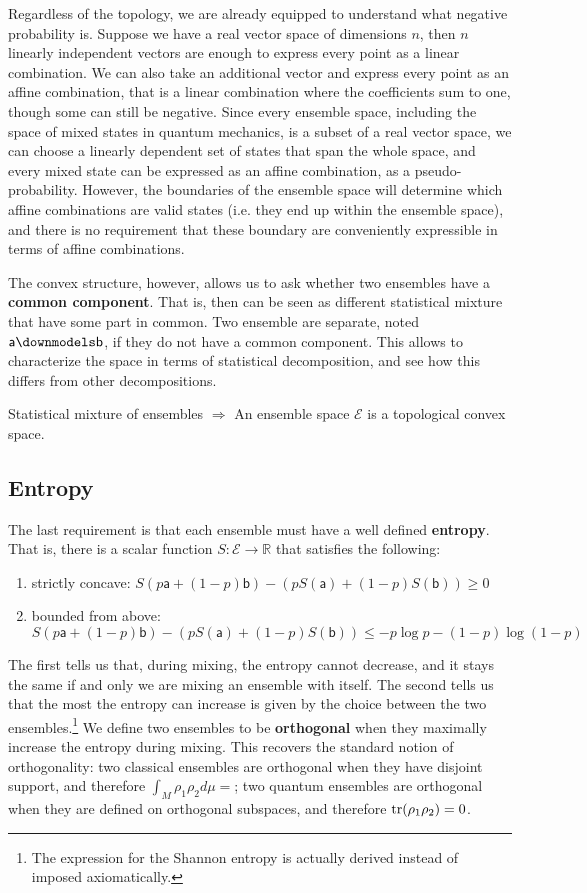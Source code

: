 \documentclass[10pt,twocolumn, nofootinbib]{revtex4-2}
\newcommand{\ens}[1][e] {\mathsf{#1}} %
\newcommand{\Ens}[1][E] {\mathcal{#1}} %
\def\separate{\downmodels}
\begin{document}
Regardless of the topology, we are already equipped to understand what negative probability is. Suppose we have a real vector space of dimensions $n$, then $n$ linearly independent vectors are enough to express every point as a linear combination. We can also take an additional vector and express every point as an affine combination, that is a linear combination where the coefficients sum to one, though some can still be negative. Since every ensemble space, including the space of mixed states in quantum mechanics, is a subset of a real vector space, we can choose a linearly dependent set of states that span the whole space, and every mixed state can be expressed as an affine combination, as a pseudo-probability. However, the boundaries of the ensemble space will determine which affine combinations are valid states (i.e. they end up within the ensemble space), and there is no requirement that these boundary are conveniently expressible in terms of affine combinations.

The convex structure, however, allows us to ask whether two ensembles have a \textbf{common component}. That is, then can be seen as different statistical mixture that have some part in common. Two ensemble are separate, noted $\ens[a] \separate \ens[b]$, if they do not have a common component. This allows to characterize the space in terms of statistical decomposition, and see how this differs from other decompositions.

\begin{tcolorbox}[colback=white, colframe=black]
	Statistical mixture of ensembles $\Rightarrow$ An ensemble space $\Ens$ is a topological convex space.
\end{tcolorbox}

\subsection{Entropy}
The last requirement is that each ensemble must have a well defined \textbf{entropy}. That is, there is a scalar function $S : \Ens \to \mathbb{R}$ that satisfies the following:
\begin{enumerate}
	\item strictly concave: $S(p \ens[a] + (1-p) \ens[b]) - (p S(\ens[a]) + (1-p) S(\ens[b]) ) \geq 0$
	\item bounded from above: $S(p \ens[a] + (1-p) \ens[b]) - (p S(\ens[a]) + (1-p) S(\ens[b]) ) \leq - p \log p - (1-p) \log(1-p)$
\end{enumerate}
The first tells us that, during mixing, the entropy cannot decrease, and it stays the same if and only we are mixing an ensemble with itself. The second tells us that the most the entropy can increase is given by the choice between the two ensembles.\footnote{The expression for the Shannon entropy is actually derived instead of imposed axiomatically.} We define two ensembles to be \textbf{orthogonal} when they maximally increase the entropy during mixing. This recovers the standard notion of orthogonality: two classical ensembles are orthogonal when they have disjoint support, and therefore $\int_M \rho_1 \rho_2 d\mu = $; two quantum ensembles are orthogonal when they are defined on orthogonal subspaces, and therefore $\operatorname{tr}(\rho_1 \rho_2) = 0$.
\end{document}
